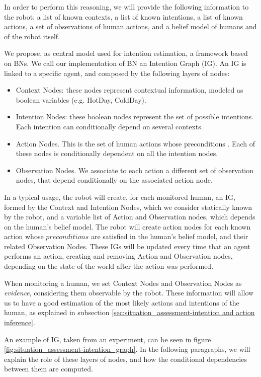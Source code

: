 In order to perform this reasoning, we will provide the following information to the robot: a list of known contexts, a list of known intentions, a list of known actions, a set of observations of human actions, and a belief model of humans and of the robot itself.

We propose, as central model used for intention estimation, a framework based on BNs. We call our implementation of BN an Intention Graph (IG).
An IG is linked to a specific agent, and composed by the following layers of nodes:
\begin{itemize}
\item Context Nodes: these nodes represent contextual information, modeled as boolean variables (e.g. HotDay, ColdDay).
\item Intention Nodes: these boolean nodes represent the set of possible intentions. Each intention can conditionally depend on several contexts.
\item Action Nodes. This is the set of human actions whose preconditions . Each of these nodes is conditionally dependent on all the intention nodes. 
\item Observation Nodes. We associate to each action a different set of observation nodes, that depend conditionally on the associated action node. 
\end{itemize}

In a typical usage, the robot will create, for each monitored human, an IG, formed by the Context and Intention Nodes, which we consider statically known by the robot, and a variable list of Action and Observation nodes, which depends on the human's belief model. The robot will create action nodes for each known action whose $preconditions$ are satisfied in the human's belief model, and their related Observation Nodes. These IGs will be updated every time that an agent performs an action, creating and removing Action and Observation nodes, depending on the state of the world after the action was performed.

When monitoring a human, we set Context Nodes and Observation Nodes as \textit{evidence}, considering them observable by the robot. These information will allow us to have a good estimation of the most likely actions and intentions of the human, as explained in subsection \ref{sec:situation_assessment-intention and action inference}. 


An example of IG, taken from an experiment, can be seen in figure \ref{fig:situation_assessment-intention_graph}. In the following paragraphs, we will explain the role of these layers of nodes, and how the conditional dependencies between them are computed.

